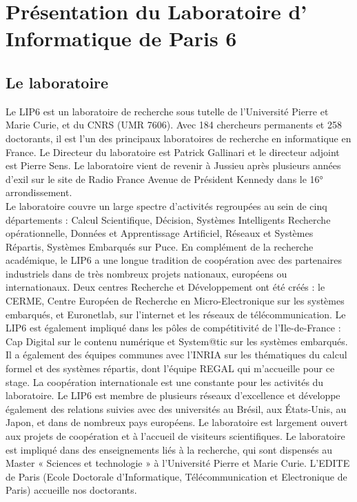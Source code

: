 \section{Présentation du Laboratoire d' Informatique de Paris 6}
	\subsection{Le laboratoire}
	Le LIP6 est un laboratoire de recherche sous tutelle de l'Université Pierre et Marie Curie, et du CNRS (UMR 7606). Avec 184 chercheurs permanents et 258 doctorants, il est l'un des principaux laboratoires de recherche en informatique en France. Le Directeur du laboratoire est Patrick Gallinari et le directeur adjoint est Pierre Sens. Le laboratoire vient de revenir à Jussieu après plusieurs années d'exil sur le site de Radio France Avenue de Président Kennedy dans le 16° arrondissement.\\
	Le laboratoire couvre un large spectre d'activités regroupées au sein de cinq départements : Calcul Scientifique, Décision, Systèmes Intelligents Recherche opérationnelle, Données et Apprentissage Artificiel, Réseaux et Systèmes Répartis, Systèmes Embarqués sur Puce. En complément de la recherche académique, le LIP6 a une longue tradition de coopération avec des partenaires industriels dans de très nombreux projets nationaux, européens ou internationaux. Deux centres Recherche et Développement  ont été créés : le CERME, Centre Européen de Recherche en Micro-Electronique sur les systèmes embarqués, et Euronetlab, sur l'internet et les réseaux de télécommunication. Le LIP6 est également impliqué dans les pôles de compétitivité de l'Ile-de-France : Cap Digital sur le contenu numérique et System@tic sur les systèmes embarqués.\\
	Il a également des équipes communes avec l'INRIA sur les thématiques du calcul formel et des systèmes répartis, dont l'équipe REGAL qui m'accueille pour ce stage. La coopération internationale est une constante pour les activités du laboratoire. Le LIP6 est membre de plusieurs réseaux d'excellence et développe également des relations suivies avec des universités au Brésil, aux États-Unis, au Japon, et dans de nombreux pays européens. Le laboratoire est largement ouvert aux projets de coopération et à l'accueil de visiteurs scientifiques. Le laboratoire est impliqué dans des enseignements liés à la recherche, qui sont dispensés au Master « Sciences et technologie » à l'Université Pierre et Marie Curie. L'EDITE de Paris (Ecole Doctorale d'Informatique, Télécommunication et Electronique de Paris) accueille nos doctorants.\\


